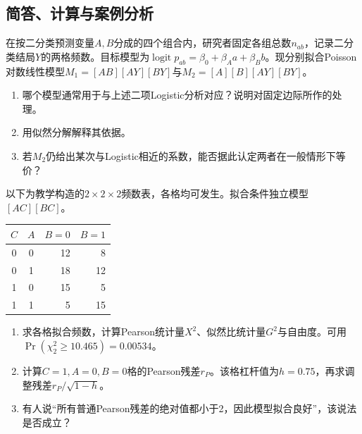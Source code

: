 \subsection{简答、计算与案例分析}

在按二分类预测变量$A,B$分成的四个组合内，研究者固定各组总数$n_{ab}$，记录二分类结局$Y$的两格频数。目标模型为$\operatorname{logit}p_{ab}=\beta_0+\beta_Aa+\beta_Bb$。现分别拟合Poisson对数线性模型$M_1=[AB][AY][BY]$与$M_2=[A][B][AY][BY]$。\begin{enumerate}\item 哪个模型通常用于与上述二项Logistic分析对应？说明对固定边际所作的处理。\item 用似然分解解释其依据。\item 若$M_2$仍给出某次与Logistic相近的系数，能否据此认定两者在一般情形下等价？\end{enumerate}

以下为教学构造的$2\times2\times2$频数表，各格均可发生。拟合条件独立模型$[AC][BC]$。\begin{center}\small\begin{tabular}{@{}ccrr@{}}\toprule $C$ & $A$ & $B=0$ & $B=1$\\\midrule 0&0&12&8\\0&1&18&12\\1&0&15&5\\1&1&5&15\\\bottomrule\end{tabular}\end{center}\begin{enumerate}\item 求各格拟合频数，计算Pearson统计量$X^2$、似然比统计量$G^2$与自由度。可用$\Pr(\chi^2_2\ge10.465)=0.00534$。\item 计算$C=1,A=0,B=0$格的Pearson残差$r_P$。该格杠杆值为$h=0.75$，再求调整残差$r_P/\sqrt{1-h}$。\item 有人说“所有普通Pearson残差的绝对值都小于2，因此模型拟合良好”，该说法是否成立？\end{enumerate}


